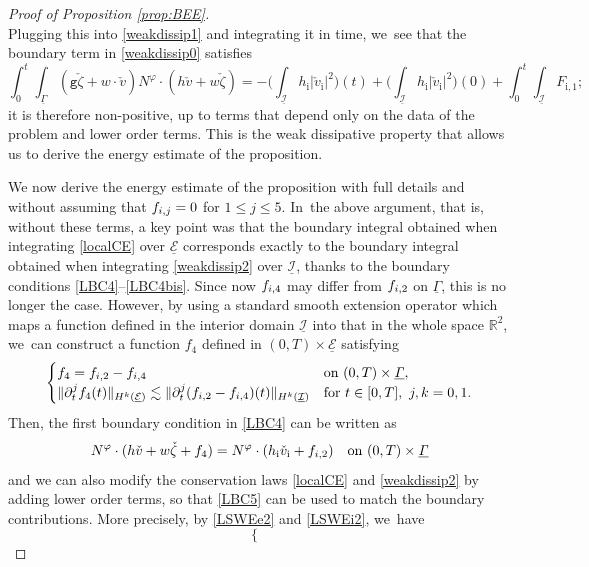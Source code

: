 \documentclass[11pt]{article}
\newcommand{\abs}[1]{\vert#1\vert}
\newcommand{\gr}{{\mathtt g}}
\newcommand{\R}{{\mathbb R}}
\newcommand{\dt}{\partial_t}
\newcommand{\cI}{{\mathcal I}}
\newcommand{\cE}{{\mathcal E}}
\newcommand{\ul}[1]{\underline{#1}}
\newcommand{\itGamma}{\mathit{\Gamma}}
\theoremstyle{definition}
\begin{document}
\begin{proof}[Proof of Proposition \ref{prop:BEE}]
\[\]
Plugging this into \eqref{weakdissip1} and integrating it in time, we~see that the boundary term in \eqref{weakdissip0} satisfies
\[
\int_0^t \int_{\ul\itGamma} (\gr\check{\zeta}+w\cdot\check{v}) N^\varphi\cdot (h\check{v}+w\check{\zeta})
= - \bigl(\int_{\ul{\cI}} h_\mathrm{i}\abs{\check{v}_\mathrm{i}}^2\bigr)(t)
+ \bigl(\int_{\ul{\cI}} h_\mathrm{i}\abs{\check{v}_\mathrm{i}}^2\bigr)(0)+\int_0^t \int_{\ul{\cI}}F_\mathrm{i,1};
\]
it is therefore non-positive, up to terms that depend only on the data of the problem and lower order terms.
This is the weak dissipative property that allows us to derive the energy estimate of the proposition.

We now derive the energy estimate of the proposition with full details and without assuming that $f_{{\rm i},j}=0$ for $1\leq j\leq 5$. In~the above argument, that is, without these terms, a key point was that the boundary integral obtained when integrating \eqref{localCE} over $\ul{\cE}$
corresponds exactly to the boundary integral obtained when integrating \eqref{weakdissip2} over $\ul{\cI}$,
thanks to the boundary conditions \eqref{LBC4}--\eqref{LBC4bis}.
Since now $f_{{\rm i},4}$ may differ from $f_{{\rm i},2}$ on $\ul{\itGamma}$, this is no longer the case.
However, by using a standard smooth extension operator which maps a function defined in the interior domain $\ul{\cI}$ into that in the whole space $\R^2$, we~can construct a function $f_4$ defined in $(0,T)\times\ul{\cE}$ satisfying
\begin{equation}\label{Ext1}
\begin{cases}
f_4 = f_{{\rm i},2}-f_{{\rm i},4} &\text{on } (0,T)\times\ul{\itGamma}, \\
\|\dt^jf_4(t)\|_{H^k(\ul{\cE})} \lesssim \|\dt^j(f_{{\rm i},2}-f_{{\rm i},4})(t)\|_{H^k(\ul{\cI})} &\text{for } t\in[0,T], \ j,k=0,1.
\end{cases}
\end{equation}
Then, the first boundary condition in \eqref{LBC4} can be written as
\begin{equation}\label{LBC5}
N^\varphi\cdot(h\check{v}+w\check{\zeta}+f_4) = N^\varphi\cdot(h_\mathrm{i}\check{v}_\mathrm{i}+f_{{\rm i},2}) \quad\text{on } (0,T)\times\ul{\itGamma}
\end{equation}
and we can also modify the conservation laws \eqref{localCE} and \eqref{weakdissip2} by adding lower order terms,
so that \eqref{LBC5} can be used to match the boundary contributions.
More precisely, by \eqref{LSWEe2} and \eqref{LSWEi2}, we~have
\[
\begin{cases}

\end{cases}\]
\end{proof}
\end{document}
